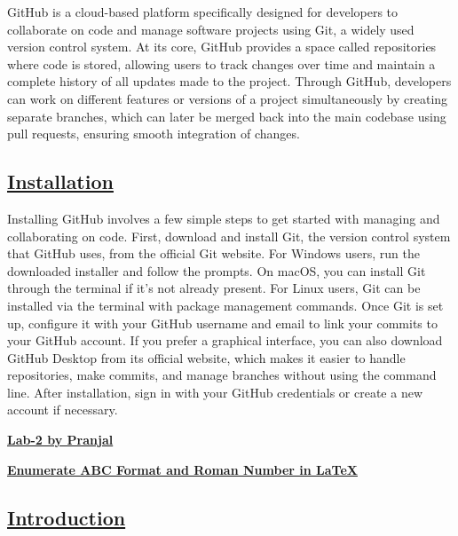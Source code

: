 \documentclass{article}
\begin{document}
\large{GitHub is a cloud-based platform specifically designed for developers to collaborate on code and manage software projects using Git, a widely used version control system. At its core, GitHub provides a space called repositories where code is stored, allowing users to track changes over time and maintain a complete history of all updates made to the project. Through GitHub, developers can work on different features or versions of a project simultaneously by creating separate branches, which can later be merged back into the main codebase using pull requests, ensuring smooth integration of changes.}
\vspace{1 cm}
\begin{center}
    \section*{\textbf{\underline{Installation}}}
\end{center}

\large{Installing GitHub involves a few simple steps to get started with managing and collaborating on code. First, download and install Git, the version control system that GitHub uses, from the official Git website. For Windows users, run the downloaded installer and follow the prompts. On macOS, you can install Git through the terminal if it’s not already present. For Linux users, Git can be installed via the terminal with package management commands. Once Git is set up, configure it with your GitHub username and email to link your commits to your GitHub account. If you prefer a graphical interface, you can also download GitHub Desktop from its official website, which makes it easier to handle repositories, make commits, and manage branches without using the command line. After installation, sign in with your GitHub credentials or create a new account if necessary.}
\newpage

\begin{center}
     \textbf{\underline{\large{Lab-2 by Pranjal}}}
     \end{center}
     \vspace{0.5cm}
\begin{center}
     \textbf{\large{\underline{Enumerate ABC Format and Roman Number in LaTeX}}}
 \end{center}

\begin{center}
    \section*{\underline{\textbf{\large{Introduction}}}}
\end{center}
\end{document}
